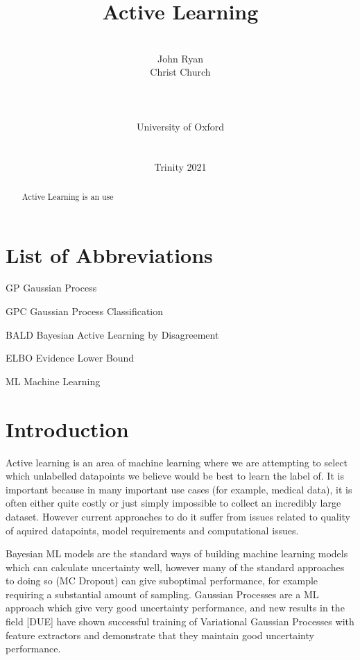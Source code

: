 \documentclass[12pt, a4paper]{report}
\date{}
\title{Active Learning}
\author{\\ \Large{John Ryan}
\\ Christ Church
\\
\\
\\
\\ University of Oxford
\\
\\ \\
Trinity 2021
}
\theoremstyle{definition}
\begin{document}

\thispagestyle{headings}
	\maketitle
\FloatBarrier
{}


\thispagestyle{empty}
\begin{abstract}

Active Learning is an use

\end{abstract}
\tableofcontents
\thispagestyle{plain}
\listoffigures
\listoftables

\chapter*{List of Abbreviations}
\begin{abbreviations}
    \item[GP] Gaussian Process
    \item[GPC] Gaussian Process Classification
    \item[BALD] Bayesian Active Learning by Disagreement
    \item[ELBO] Evidence Lower Bound
    \item[ML] Machine Learning
\end{abbreviations}

\chapter{Introduction}

Active learning is an area of machine learning where we are attempting to select which unlabelled datapoints we believe would be best to learn the label of. It is important because in many important use cases (for example, medical data), it is often either quite costly or just simply impossible to collect an incredibly large dataset. However current approaches to do it suffer from issues related to quality of aquired datapoints, model requirements and computational issues.

Bayesian ML models are the standard ways of building machine learning models which can calculate uncertainty well, however many of the standard approaches to doing so (MC Dropout) can give suboptimal performance, for example requiring a substantial amount of sampling. Gaussian Processes are a ML approach which give very good uncertainty performance, and new results in the field [DUE] have shown successful training of Variational Gaussian Processes with feature extractors and demonstrate that they maintain good uncertainty performance.
\end{document}
